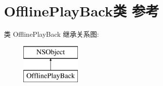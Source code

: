 \hypertarget{interface_offline_play_back}{}\section{Offline\+Play\+Back类 参考}
\label{interface_offline_play_back}
类 Offline\+Play\+Back 继承关系图\+:\begin{figure}[H]
\begin{center}
\leavevmode
\includegraphics[height=2.000000cm]{interface_offline_play_back}
\end{center}
\end{figure}
